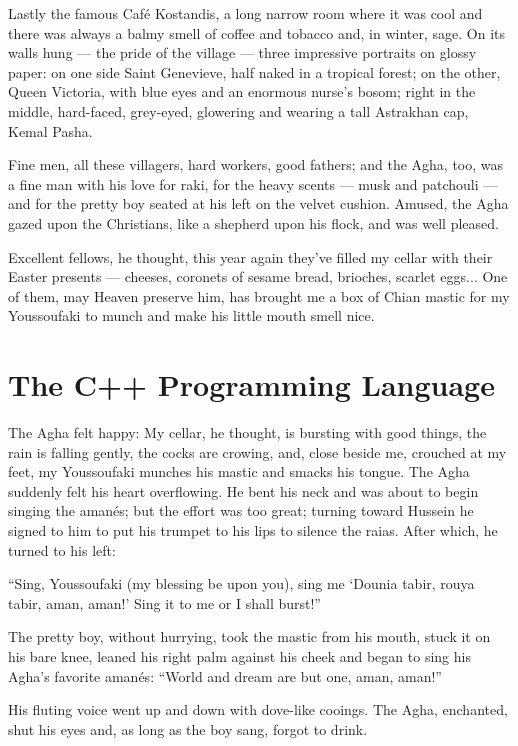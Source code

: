 \documentclass[diploma]{softlab-thesis}
\begin{document}
Lastly the famous Café Kostandis, a long narrow room where it was cool and
there was always a balmy smell of coffee and tobacco and, in winter,
sage. On its walls hung --- the pride of the village --- three impressive
portraits on glossy paper: on one side Saint Genevieve, half naked in a
tropical forest; on the other, Queen Victoria, with blue eyes and an
enormous nurse’s bosom; right in the middle, hard-faced, grey-eyed,
glowering and wearing a tall Astrakhan cap, Kemal Pasha.

Fine men, all these villagers, hard workers, good fathers; and the Agha,
too, was a fine man with his love for raki, for the heavy scents --- musk
and patchouli --- and for the pretty boy seated at his left on the velvet
cushion. Amused, the Agha gazed upon the Christians, like a shepherd upon
his flock, and was well pleased.

Excellent fellows, he thought, this year again they’ve filled my cellar with
their Easter presents --- cheeses, coronets of sesame bread, brioches,
scarlet eggs... One of them, may Heaven preserve him, has brought me a box
of Chian mastic for my Youssoufaki to munch and make his little mouth smell
nice.


\section{The C++ Programming Language}

The Agha felt happy: My cellar, he thought, is bursting with good things,
the rain is falling gently, the cocks are crowing, and, close beside me,
crouched at my feet, my Youssoufaki munches his mastic and smacks his
tongue. The Agha suddenly felt his heart overflowing. He bent his neck and
was about to begin singing the amanés; but the effort was too great; turning
toward Hussein he signed to him to put his trumpet to his lips to silence
the raias. After which, he turned to his left:

``Sing, Youssoufaki (my blessing be upon you), sing me `Dounia tabir, rouya
tabir, aman, aman!' Sing it to me or I shall burst!''

The pretty boy, without hurrying, took the mastic from his mouth, stuck it
on his bare knee, leaned his right palm against his cheek and began to sing
his Agha’s favorite amanés: ``World and dream are but one, aman, aman!''

His fluting voice went up and down with dove-like cooings. The Agha,
enchanted, shut his eyes and, as long as the boy sang, forgot to drink.
\end{document}
